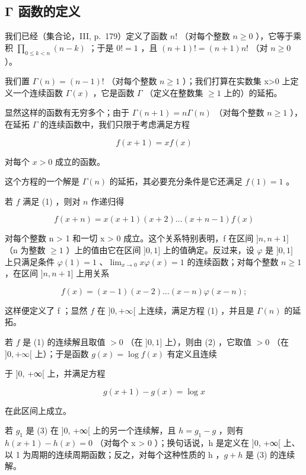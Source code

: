 \subsection{Γ 函数的定义}

我们已经（集合论，III, p.~179）定义了函数 \(n!\) （对每个整数 \(n \geqslant 0\) ），它等于乘积 \(\prod_{0 \leqslant k < n} (n - k)\) ；于是 \(0! = 1\) ，且 \((n + 1)! = (n + 1)n!\) （对 \(n \geqslant 0\) ）。

我们置 \(\Gamma(n)=(n-1)!\) （对每个整数 \(n\geqslant1\) ）；我们打算在实数集 x\textgreater0 上定义一个连续函数 \(\Gamma(x)\) ，它是函数 \(\Gamma\) （定义在整数集 \(\geqslant1\) 上的）的延拓。

显然这样的函数有无穷多个；由于 \(\Gamma(n+1)=n\Gamma(n)\) （对每个整数 \(n\geqslant1\) ），在延拓 \(\Gamma\) 的连续函数中，我们只限于考虑满足方程

\[
f (x + 1) = x f (x)\tag{1}
\]

对每个 \(x > 0\) 成立的函数。

这个方程的一个解是 \(\Gamma(n)\) 的延拓，其必要充分条件是它还满足 \(f(1) = 1\) 。

若 \(f\) 满足 (1) ，则对 \(n\) 作递归得

\[
f (x + n) = x (x + 1) (x + 2) \dots (x + n - 1) f (x)\tag{2}
\]

对每个整数 n \textgreater{} 1 和一切 x \textgreater{} 0 成立。这个关系特别表明，f 在区间 \(]n, n + 1]\) （n 为整数 \(\geqslant 1\) ）上的值由它在区间 \(]0, 1]\) 上的值确定。反过来，设 \(\varphi\) 是 \(]0, 1]\) 上只满足条件 \(\varphi(1) = 1\) 、\(\lim_{x \to 0} x \varphi(x) = 1\) 的连续函数；对每个整数 \(n \geqslant 1\) ，在区间 \(]n, n + 1]\) 上用关系

\[
f (x) = (x - 1) (x - 2) \dots (x - n) \varphi (x - n);
\]

这样便定义了 f ；显然 \(f\) 在 \(]0, +\infty[\) 上连续，满足方程 (1) ，并且是 \(\Gamma(n)\) 的延拓。

若 \(f\) 是 (1) 的连续解且取值 \(> 0\) （在 \(]0, 1]\) 上），则由 (2) ，它取值 \(> 0\) （在 \(]0, +\infty[\) 上）；于是函数 \(g(x) = \log f(x)\) 有定义且连续

于 {]}0, +∞{[} 上，并满足方程

\[
g (x + 1) - g (x) = \log x\tag{3}
\]

在此区间上成立。

若 \(g_{1}\) 是 (3) 在 {]}0, +∞{[} 上的另一个连续解，且 \(h = g_{1} - g\) ，则有 \(h(x + 1) - h(x) = 0\) （对每个 x \textgreater{} 0 ）；换句话说，h 是定义在 {]}0, +∞{[} 上、以 1 为周期的连续周期函数；反之，对每个这种性质的 h ，\(g + h\) 是 (3) 的连续解。

